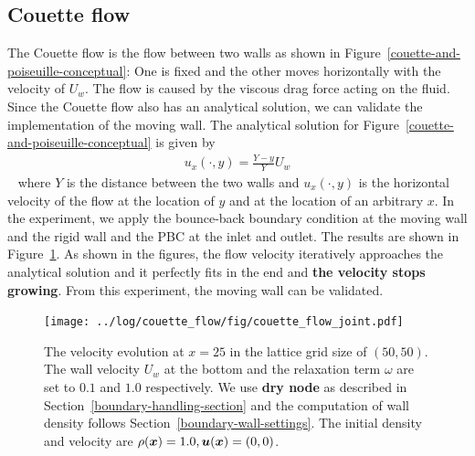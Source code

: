 \subsection{Couette flow}
The Couette flow is the flow between two walls as shown in
Figure~\ref{couette-and-poiseuille-conceptual}:
One is fixed and the other moves horizontally with the velocity of $U_w$.
The flow is caused by the viscous drag force acting on the fluid.
Since the Couette flow also has an analytical solution,
we can validate the implementation of the moving wall.
The analytical solution for Figure~\ref{couette-and-poiseuille-conceptual} is given by
\begin{equation}
\begin{aligned}
  u_x(\cdot, y) =\frac{Y - y}{Y}U_w
\end{aligned}
\end{equation}
~\cite{nagy2019graphical} where $Y$ is the distance between the two walls
and $u_x(\cdot, y)$ is the horizontal velocity of the flow
at the location of $y$ and at the location of
an arbitrary $x$. 
In the experiment, we apply the bounce-back boundary condition
at the moving wall and the rigid wall
and the PBC at the inlet and outlet.
The results are shown in Figure~\ref{fig:couette-velocity-evolution}.
As shown in the figures, the flow velocity iteratively approaches
the analytical solution and it perfectly fits in the end
and {\bf the velocity stops growing}.
From this experiment, the moving wall can be validated.

\begin{figure}[H]
  \vspace{-1mm}
  \centering
  \texttt{[image: ../log/couette\_flow/fig/couette\_flow\_joint.pdf]}
  \vspace{-5mm}
  \caption{The velocity evolution at
  $x = 25$ in the lattice grid size of $(50, 50)$.
  The wall velocity $U_w$ at the bottom and the relaxation term $\omega$ are set
  to $0.1$ and $1.0$ respectively.
  We use {\bf dry node} as described in Section~\ref{boundary-handling-section}
  and the computation of wall density follows Section~\ref{boundary-wall-settings}.
  The initial density and velocity are $\rho(\boldsymbol{x}) = 1.0, \boldsymbol{u}(\boldsymbol{x}) = (0, 0)$.
  \label{fig:couette-velocity-evolution}}
\end{figure}

